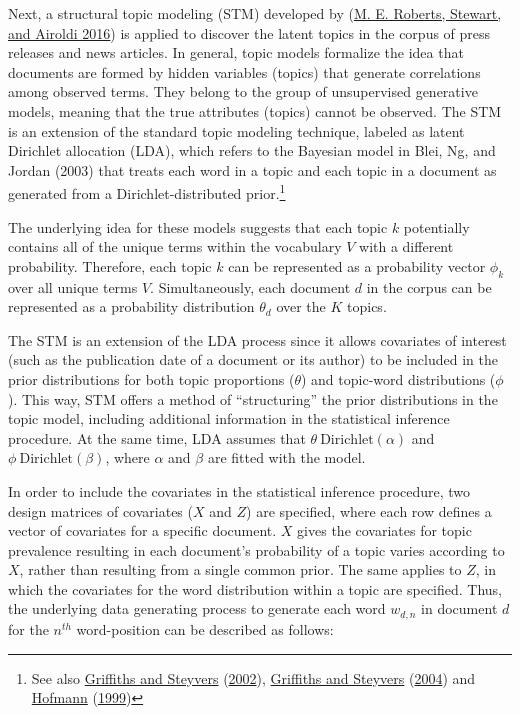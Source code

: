 \documentclass[
  12pt,
]{article}
\begin{document}
Next, a structural topic modeling (STM) developed by
(\protect\hyperlink{ref-roberts_model_2016}{M. E. Roberts, Stewart, and
Airoldi 2016}) is applied to discover the latent topics in the corpus of
press releases and news articles. In general, topic models formalize the
idea that documents are formed by hidden variables (topics) that
generate correlations among observed terms. They belong to the group of
unsupervised generative models, meaning that the true attributes
(topics) cannot be observed. The STM is an extension of the standard
topic modeling technique, labeled as latent Dirichlet allocation (LDA),
which refers to the Bayesian model in Blei, Ng, and Jordan (2003) that
treats each word in a topic and each topic in a document as generated
from a Dirichlet-distributed prior.\footnote{See also
  \protect\hyperlink{ref-griffiths_probabilistic_2002}{Griffiths and
  Steyvers}
  (\protect\hyperlink{ref-griffiths_probabilistic_2002}{2002}),
  \protect\hyperlink{ref-griffiths_finding_2004}{Griffiths and Steyvers}
  (\protect\hyperlink{ref-griffiths_finding_2004}{2004}) and
  \protect\hyperlink{ref-hofmann_probabilistic_1999}{Hofmann}
  (\protect\hyperlink{ref-hofmann_probabilistic_1999}{1999})}

The underlying idea for these models suggests that each topic \(k\)
potentially contains all of the unique terms within the vocabulary \(V\)
with a different probability. Therefore, each topic \(k\) can be
represented as a probability vector \(\phi_k\) over all unique terms
\(V\). Simultaneously, each document \(d\) in the corpus can be
represented as a probability distribution \(\theta_d\) over the \(K\)
topics.

The STM is an extension of the LDA process since it allows covariates of
interest (such as the publication date of a document or its author) to
be included in the prior distributions for both topic proportions
(\(\theta\)) and topic-word distributions (\(\phi\)). This way, STM
offers a method of ``structuring'' the prior distributions in the topic
model, including additional information in the statistical inference
procedure. At the same time, LDA assumes that
\(\theta ~ \text{Dirichlet}(\alpha)\) and
\(\phi ~ \text{Dirichlet}(\beta)\), where \(\alpha\) and \(\beta\) are
fitted with the model.

In order to include the covariates in the statistical inference
procedure, two design matrices of covariates (\(X\) and \(Z\)) are
specified, where each row defines a vector of covariates for a specific
document. \(X\) gives the covariates for topic prevalence resulting in
each document's probability of a topic varies according to \(X\), rather
than resulting from a single common prior. The same applies to \(Z\), in
which the covariates for the word distribution within a topic are
specified. Thus, the underlying data generating process to generate each
word \(w_{d,n}\) in document \(d\) for the \(n^{th}\) word-position can
be described as follows:
\end{document}
